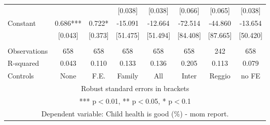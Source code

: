\begin{tabular}{lccccccc}
 &  &  & [0.038] & [0.038] & [0.066] & [0.065] & [0.038] \\
Constant & 0.686*** & 0.722* & -15.091 & -12.664 & -72.514 & -44.860 & -13.654 \\
 & [0.043] & [0.373] & [51.475] & [51.494] & [84.408] & [87.665] & [50.420] \\
 &  &  &  &  &  &  &  \\
Observations & 658 & 658 & 658 & 658 & 658 & 242 & 658 \\
R-squared & 0.043 & 0.110 & 0.133 & 0.136 & 0.205 & 0.113 & 0.079 \\
 Controls & None & F.E. & Family & All & Inter & Reggio & no FE \\ \hline
\multicolumn{8}{c}{ Robust standard errors in brackets} \\
\multicolumn{8}{c}{ *** p$<$0.01, ** p$<$0.05, * p$<$0.1} \\
\multicolumn{8}{c}{ Dependent variable: Child health is good (\%) - mom report.} \\
\end{tabular}
